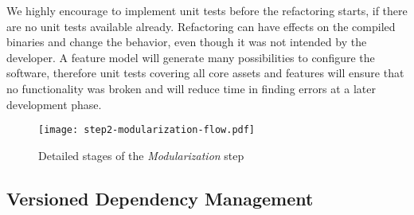 We highly encourage to implement unit tests before the refactoring starts, if
there are no unit tests available already. Refactoring can have effects on the
compiled binaries and change the behavior, even though it was not intended by
the developer. A feature model will generate many possibilities to configure the
software, therefore unit tests covering all core assets and features will ensure
that no functionality was broken and will reduce time in finding errors at a
later development phase.

\begin{figure}[htb]
  \centering
  \texttt{[image: step2-modularization-flow.pdf]}
  \caption{Detailed stages of the \textit{Modularization} step}
  \label{fig:step2Modularization}
\end{figure}

\subsection{Versioned Dependency Management}\label{dependencies}

